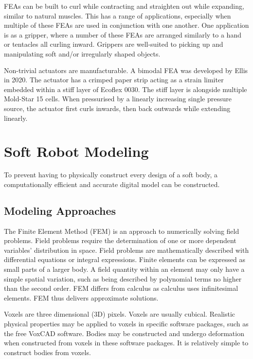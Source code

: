 FEAs can be built to curl while contracting and straighten out while expanding, similar to natural muscles. This has a range of applications, especially when multiple of these FEAs are used in conjunction with one another. One application is as a gripper, where a number of these FEAs are arranged similarly to a hand or tentacles all curling inward. Grippers are well-suited to picking up and manipulating soft and/or irregularly shaped objects. \cite{Whitesides2018}

Non-trivial actuators are manufacturable. A bimodal FEA was developed by Ellis in 2020. The actuator has a crimped paper strip acting as a strain limiter embedded within a stiff layer of Ecoflex 0030. The stiff layer is alongside multiple Mold-Star 15 cells. When pressurised by a linearly increasing single pressure source, the actuator  first curls inwards, then back outwards while extending linearly. \cite{Ellis2020}

\section{Soft Robot Modeling}

To prevent having to physically construct every design of a soft body, a computationally efficient and accurate digital model can be constructed.

\subsection{Modeling Approaches}

The Finite Element Method (FEM) is an approach to numerically solving field problems. Field problems require the determination of one or more dependent variables' distribution in space. Field problems are mathematically described with differential equations or integral expressions. Finite elements can be expressed as small parts of a larger body. A field quantity within an element may only have a simple spatial variation, such as being described by polynomial terms no higher than the second order. FEM differs from calculus as calculus uses infinitesimal elements. FEM thus delivers approximate solutions. \cite{Cook2002}

Voxels are three dimensional (3D) pixels. Voxels are usually cubical. Realistic physical properties may be applied to voxels in specific software packages, such as the free VoxCAD software. Bodies may be constructed and undergo deformation when constructed from voxels in these software packages. It is relatively simple to construct bodies from voxels. \cite{Cheney2013,Cheney2015}

